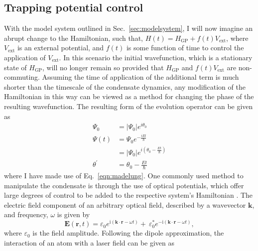 \subsection{Trapping potential control}\label{ss:pert_opt_latt}
With the model system outlined in Sec.~\ref{sec:modelsystem}, I will now imagine an abrupt change to the Hamiltonian, such that, $H(t) = H_{\textrm{GP}} + f(t) V_{\textrm{ext}}$, where $V_{\textrm{ext}}$ is an external potential, and $f(t)$ is some function of time to control the application of $V_{\textrm{ext}}$. In this scenario the initial wavefunction, which is a stationary state of $H_{\textrm{GP}}$, will no longer remain so provided that $H_{\textrm{GP}}$ and $f(t) V_{\textrm{ext}}$ are non-commuting. Assuming the time of application of the additional term is much shorter than the timescale of the condensate dynamics, any modification of the Hamiltonian in this way can be viewed as a method for changing the phase of the resulting wavefunction.
The resulting form of the evolution operator can be given as
\begin{subequations}
\begin{align}
    \Psi_0 &= |\Psi_0|e^{i\theta_0} \\
    \Psi(t) &= \Psi_0 e^{-\frac{i E t}{\hbar}} \\
            &= |\Psi_0| e^{i\left(\theta_0 - \frac{E t}{\hbar}\right)} \nonumber \\
    \theta^{'} &= \theta_0 - \frac{E t}{\hbar}
\end{align}
\end{subequations}
where I have made use of Eq.~\eqref{eqn:madelung}. One commonly used method to manipulate the condensate is through the use of optical potentials, which offer large degrees of control to be added to the respective system's Hamiltonian \cite{BEC:Bloch_revmodphys_2008}. The electric field component of an arbitrary optical field, described by a wavevector $\mathbf{k}$, and frequency, $\omega$ is given by
\begin{equation}
    \mathbf{E}(\mathbf{r},t) = \varepsilon_0 e^{\textrm{i}\left(\mathbf{k}\cdot\mathbf{r} - \omega t\right)} + \ \varepsilon_0^{*} e^{-\textrm{i}\left(\mathbf{k}\cdot\mathbf{r} - \omega t\right)},
\end{equation}
where $\varepsilon_0$ is the field amplitude. Following the dipole approximation, the interaction of an atom with a laser field can be given as~\cite{BK:Foot_2005}
